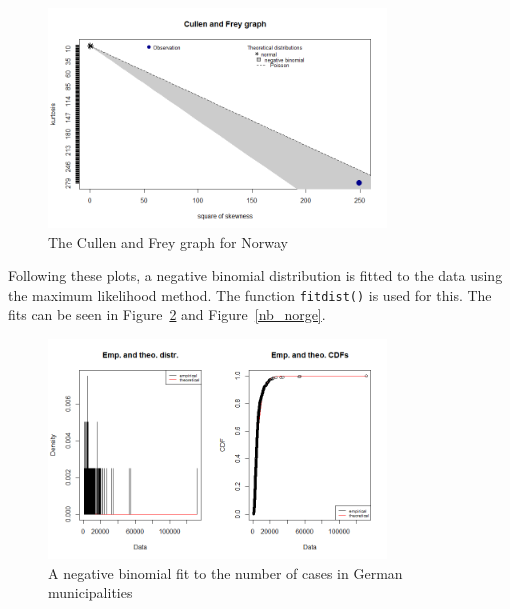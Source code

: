 %     
\begin{figure}[H]
    \centering
    \includegraphics[width = 0.8\textwidth]{cf_norge.png}
    \caption{The Cullen and Frey graph for Norway}
    \label{cf_norge}
\end{figure}
Following these plots, a negative binomial distribution is fitted to the data using the maximum likelihood method. The function \texttt{fitdist()} is used for this. The fits can be seen in Figure~\ref{nb_germany} and Figure~\ref{nb_norge}.
%     
\begin{figure}[H]
    \centering
    \includegraphics[width = 0.8\textwidth]{neg_binom_germany.png}
    \caption{A negative binomial fit to the number of cases in German municipalities}
    \label{nb_germany}
\end{figure}
